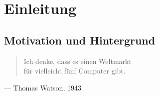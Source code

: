 
\chapter{Einleitung}
\section{Motivation und Hintergrund}

\begin{quote}
\glqq Ich denke, dass es einen Weltmarkt \\
\noindent\hspace*{20mm}für vielleicht fünf Computer gibt.\grqq
\end{quote}
\begin{flushright}
--- \textup{Thomas Watson, 1943}
\end{flushright}

